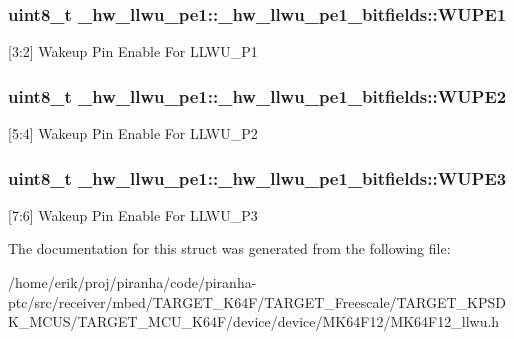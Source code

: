 \subsubsection[{\texorpdfstring{W\+U\+P\+E1}{WUPE1}}]{\setlength{\rightskip}{0pt plus 5cm}uint8\+\_\+t \+\_\+hw\+\_\+llwu\+\_\+pe1\+::\+\_\+hw\+\_\+llwu\+\_\+pe1\+\_\+bitfields\+::\+W\+U\+P\+E1}\hypertarget{struct__hw__llwu__pe1_1_1__hw__llwu__pe1__bitfields_a13c9579f5c69b2929a8a219fcebd815c}{}\label{struct__hw__llwu__pe1_1_1__hw__llwu__pe1__bitfields_a13c9579f5c69b2929a8a219fcebd815c}
\mbox{[}3\+:2\mbox{]} Wakeup Pin Enable For L\+L\+W\+U\+\_\+\+P1 
\subsubsection[{\texorpdfstring{W\+U\+P\+E2}{WUPE2}}]{\setlength{\rightskip}{0pt plus 5cm}uint8\+\_\+t \+\_\+hw\+\_\+llwu\+\_\+pe1\+::\+\_\+hw\+\_\+llwu\+\_\+pe1\+\_\+bitfields\+::\+W\+U\+P\+E2}\hypertarget{struct__hw__llwu__pe1_1_1__hw__llwu__pe1__bitfields_a7989c97c33caa1c9d314ff9b05ab4c7e}{}\label{struct__hw__llwu__pe1_1_1__hw__llwu__pe1__bitfields_a7989c97c33caa1c9d314ff9b05ab4c7e}
\mbox{[}5\+:4\mbox{]} Wakeup Pin Enable For L\+L\+W\+U\+\_\+\+P2 
\subsubsection[{\texorpdfstring{W\+U\+P\+E3}{WUPE3}}]{\setlength{\rightskip}{0pt plus 5cm}uint8\+\_\+t \+\_\+hw\+\_\+llwu\+\_\+pe1\+::\+\_\+hw\+\_\+llwu\+\_\+pe1\+\_\+bitfields\+::\+W\+U\+P\+E3}\hypertarget{struct__hw__llwu__pe1_1_1__hw__llwu__pe1__bitfields_a2820d33f1de85071a95eb0493834c9a9}{}\label{struct__hw__llwu__pe1_1_1__hw__llwu__pe1__bitfields_a2820d33f1de85071a95eb0493834c9a9}
\mbox{[}7\+:6\mbox{]} Wakeup Pin Enable For L\+L\+W\+U\+\_\+\+P3 

The documentation for this struct was generated from the following file\+:\begin{DoxyCompactItemize}
\item 
/home/erik/proj/piranha/code/piranha-\/ptc/src/receiver/mbed/\+T\+A\+R\+G\+E\+T\+\_\+\+K64\+F/\+T\+A\+R\+G\+E\+T\+\_\+\+Freescale/\+T\+A\+R\+G\+E\+T\+\_\+\+K\+P\+S\+D\+K\+\_\+\+M\+C\+U\+S/\+T\+A\+R\+G\+E\+T\+\_\+\+M\+C\+U\+\_\+\+K64\+F/device/device/\+M\+K64\+F12/M\+K64\+F12\+\_\+llwu.\+h\end{DoxyCompactItemize}
